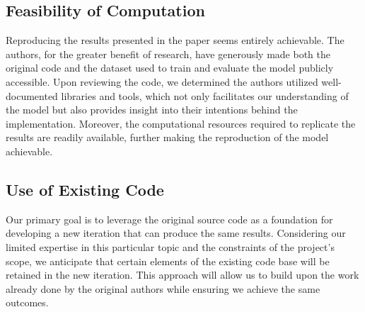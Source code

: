 \documentclass[letterpaper]{article} %
\begin{document}
\subsection{Feasibility of Computation}

Reproducing the results presented in the paper seems entirely achievable. The authors, for the greater benefit of research, have generously made both the original code and the dataset used to train and evaluate the model publicly accessible. Upon reviewing the code, we determined the authors utilized well-documented libraries and tools, which not only facilitates our understanding of the model but also provides insight into their intentions behind the implementation. Moreover, the computational resources required to replicate the results are readily available, further making the reproduction of the model achievable.

\subsection{Use of Existing Code}

Our primary goal is to leverage the original source code as a foundation for developing a new iteration that can produce the same results. Considering our limited expertise in this particular topic and the constraints of the project's scope, we anticipate that certain elements of the existing code base will be retained in the new iteration. This approach will allow us to build upon the work already done by the original authors while ensuring we achieve the same outcomes.

% 
\end{document}
